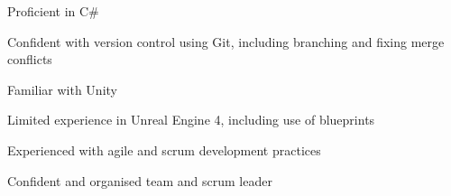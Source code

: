 


\begin{cvparagraph}
    
    \begin{cvitems}
        \text{}
        \item
        \item Proficient in C\# 
        \item Confident with version control using Git, including branching and fixing merge conflicts
        \item Familiar with Unity
        \item Limited experience in Unreal Engine 4, including use of blueprints
        \item Experienced with agile and scrum development practices
        \item Confident and organised team and scrum leader
    \end{cvitems}

\end{cvparagraph}